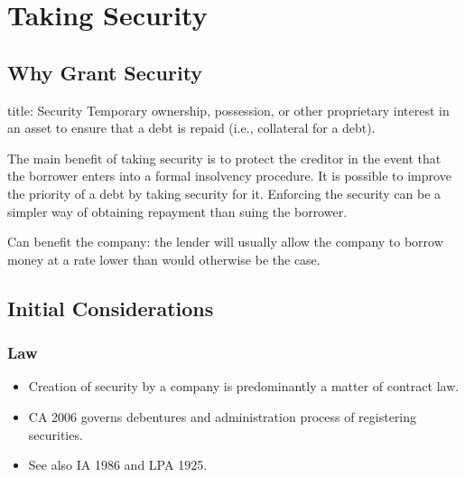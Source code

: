 \documentclass[
]{article}
\newenvironment{Shaded}{}{}
\newcommand{\NormalTok}[1]{#1}
\providecommand{\tightlist}{%
  \setlength{\itemsep}{0pt}\setlength{\parskip}{0pt}}
\begin{document}
\hypertarget{taking-security}{%
\section{Taking Security}\label{taking-security}}

\begin{Shaded}
\begin{Highlighting}[]

\end{Highlighting}
\end{Shaded}

\hypertarget{why-grant-security}{%
\subsection{Why Grant Security}\label{why-grant-security}}

\begin{Shaded}
\begin{Highlighting}[]
\NormalTok{title: Security}
\NormalTok{Temporary ownership, possession, or other proprietary interest in an asset to ensure that a debt is repaid (i.e., collateral for a debt).}
\end{Highlighting}
\end{Shaded}

The main benefit of taking security is to protect the creditor in the
event that the borrower enters into a formal insolvency procedure. It is
possible to improve the priority of a debt by taking security for it.
Enforcing the security can be a simpler way of obtaining repayment than
suing the borrower.

Can benefit the company: the lender will usually allow the company to
borrow money at a rate lower than would otherwise be the case.

\hypertarget{initial-considerations}{%
\subsection{Initial Considerations}\label{initial-considerations}}

\hypertarget{law}{%
\subsubsection{Law}\label{law}}

\begin{itemize}
\tightlist
\item
  Creation of security by a company is predominantly a matter of
  contract law.
\item
  CA 2006 governs debentures and administration process of registering
  securities.
\item
  See also IA 1986 and LPA 1925.
\end{itemize}
\end{document}
